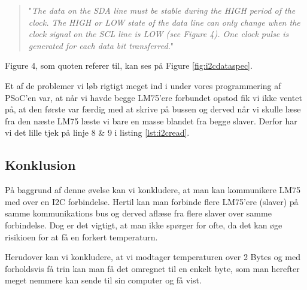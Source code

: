 \documentclass[../main.tex]{subfiles}
\begin{document}
\begin{quote}
    "\textit{The data on the SDA line must be stable during the HIGH period of the clock. The HIGH
or LOW state of the data line can only change when the clock signal on the SCL line is
LOW (see Figure 4). One clock pulse is generated for each data bit transferred.}"
\end{quote}
Figure 4, som quoten referer til, kan ses på Figure \ref{fig:i2cdataspec}.

Et af de problemer vi løb rigtigt meget ind i under vores programmering af PSoC'en var, at når vi havde begge LM75'ere forbundet opstod fik vi ikke ventet på, at den første var færdig med at skrive på bussen 
og derved når vi skulle læse fra den næste LM75 læste vi bare en masse blandet fra begge slaver.
Derfor har vi det lille tjek på linje 8 \& 9 i listing \ref{lst:i2cread}.

\subsection{Konklusion}
På baggrund af denne øvelse kan vi konkludere, at man kan kommunikere LM75 med over en I2C forbindelse. 
Hertil kan man forbinde flere LM75'ere (slaver) på samme kommunikations bus og derved aflæse fra flere slaver over samme forbindelse.
Dog er det vigtigt, at man ikke spørger for ofte, da det kan øge risikioen for at få en forkert temperaturn.

Herudover kan vi konkludere, at vi modtager temperaturen over 2 Bytes og med forholdsvis få trin kan man få det omregnet til en enkelt byte, som man herefter meget nemmere kan sende til sin computer og få vist.
\end{document}
